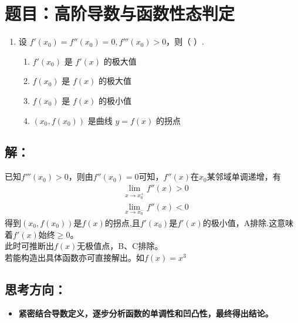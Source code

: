 \documentclass[UTF8]{ctexart}
\begin{document}
\newpage
\section{题目：高阶导数与函数性态判定}

\begin{enumerate}
    \item[2.(2)] 设 $f'(x_0) = f''(x_0) = 0, f'''(x_0) > 0$，则（ \quad ）.
    \begin{enumerate}[label=(\Alph*)]
        \item $f'(x_0)$ 是 $f'(x)$ 的极大值
        \item $f(x_0)$ 是 $f(x)$ 的极大值
        \item $f(x_0)$ 是 $f(x)$ 的极小值
        \item $(x_0, f(x_0))$ 是曲线 $y=f(x)$ 的拐点
    \end{enumerate}
\end{enumerate}

\subsection*{解：}
已知$f'''(x_{0})>0$，则由$f''(x_{0})=0$可知，$f''(x)$在$x_{0}$某邻域单调递增，有
\begin{align*}
     &\lim_{x \to x_{0}^{+}} f''(x) > 0 \\
     &\lim_{x \to x_{0}^{-}} f''(x) < 0
\end{align*}
得到$(x_{0},f(x_0))$是$f(x)$的拐点,且$f'(x_{0})$是$f'(x)$的极小值，A排除.这意味着$f'(x)$始终$\ge 0$。 
\\

此时可推断出$f(x)$无极值点，B、C排除。 
\\

若能构造出具体函数亦可直接解出。如$f(x)=x^{3}$

\subsection*{思考方向：}
\begin{itemize}
    \item \textbf{ 紧密结合导数定义，逐步分析函数的单调性和凹凸性，最终得出结论。}
\end{itemize}
\end{document}
